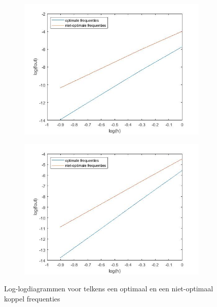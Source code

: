 \documentclass[12pt]{article}
\begin{document}
\begin{figure}[H]
    \centering
    \begin{subfigure}{0.49\textwidth}
        \includegraphics[width=\textwidth]{loglog1rks3.jpg}
    \end{subfigure}
    \begin{subfigure}{0.49\textwidth}
        \includegraphics[width=\textwidth]{loglogkrks3.jpg}
    \end{subfigure}
    \caption{Log-logdiagrammen voor telkens een optimaal en een niet-optimaal koppel frequenties}
    \label{fig:simpleorderrks3}
\end{figure}
\end{document}
